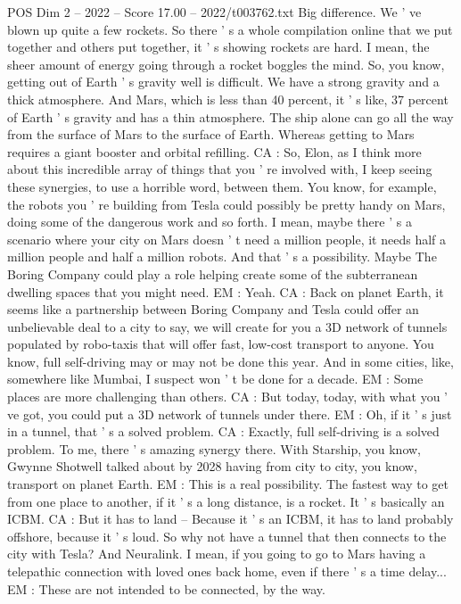 \begin{textsample}{POS Dim 2 – 2022 – Score 17.00 – 2022/t003762.txt}
Big difference.
We ' ve blown up quite a few rockets.
So there ' s a whole compilation online that we put together and others put together, it ' s showing rockets are hard.
I mean, the sheer amount of energy going through a rocket boggles the mind.
So, you know, getting out of Earth ' s gravity well is difficult.
We have a strong gravity and a thick atmosphere.
And Mars, which is less than 40 percent, it ' s like, 37 percent of Earth ' s gravity and has a thin atmosphere.
The ship alone can go all the way from the surface of Mars to the surface of Earth.
Whereas getting to Mars requires a giant booster and orbital refilling.
CA : So, Elon, as I think more about this incredible array of things that you ' re involved with, I keep seeing these synergies, to use a horrible word, between them.
You know, for example, the robots you ' re building from Tesla could possibly be pretty handy on Mars, doing some of the dangerous work and so forth.
I mean, maybe there ' s a scenario where your city on Mars doesn ' t need a million people, it needs half a million people and half a million robots.
And that ' s a possibility.
Maybe The Boring Company could play a role helping create some of the subterranean dwelling spaces that you might need.
EM : Yeah.
CA : Back on planet Earth, it seems like a partnership between Boring Company and Tesla could offer an unbelievable deal to a city to say, we will create for you a 3D network of tunnels populated by robo-taxis that will offer fast, low-cost transport to anyone.
You know, full self-driving may or may not be done this year.
And in some cities, like, somewhere like Mumbai, I suspect won ' t be done for a decade.
EM : Some places are more challenging than others.
CA : But today, today, with what you ' ve got, you could put a 3D network of tunnels under there.
EM : Oh, if it ' s just in a tunnel, that ' s a solved problem.
CA : Exactly, full self-driving is a solved problem.
To me, there ' s amazing synergy there.
With Starship, you know, Gwynne Shotwell talked about by 2028 having from city to city, you know, transport on planet Earth.
EM : This is a real possibility.
The fastest way to get from one place to another, if it ' s a long distance, is a rocket.
It ' s basically an ICBM.
CA : But it has to land -- Because it ' s an ICBM, it has to land probably offshore, because it ' s loud.
So why not have a tunnel that then connects to the city with Tesla?
And Neuralink.
I mean, if you going to go to Mars having a telepathic connection with loved ones back home, even if there ' s a time delay...
EM : These are not intended to be connected, by the way.

\end{textsample}

